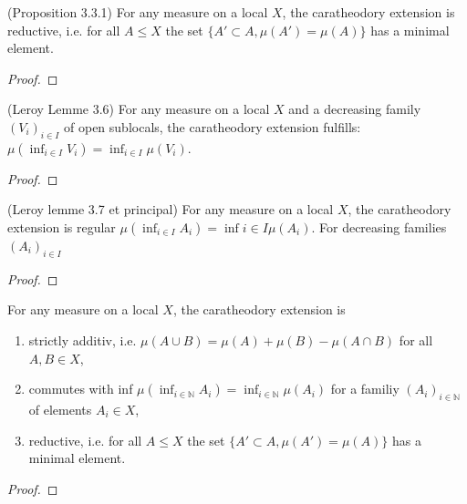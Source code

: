 \begin{proposition}[reductive]
    \leanok
    \label{prop:reductive}  (Proposition 3.3.1)
    For any measure on a local $X$, the caratheodory extension is
    reductive, i.e. for all $A \le X$ the set $\{A' \subset A, \mu(A') = \mu(A)\}$ has a minimal element.
\end{proposition}
\begin{proof}
    \leanok
\end{proof}



\begin{lemma}
(Leroy Lemme 3.6)
    \label{lem:commutes_with_inf_opens}
    \leanok
For any measure on a local $X$ and a decreasing family $(V_i)_{i\in I}$ of open sublocals, the caratheodory extension fulfills: $\mu (\inf_{i\in I} V_i) = \inf_{i\in I} \mu(V_i)$.
\end{lemma}
\begin{proof}
    \leanok
\end{proof}

\begin{proposition}
(Leroy lemme 3.7 et principal)
    \leanok
    \label{prop:commutes_with_inf}
    For any measure on a local $X$, the caratheodory extension is
    regular $\mu (\inf_{i\in I} A_i) = \inf{i\in I} \mu(A_i)$. For decreasing families $(A_i)_{i\in I}$
\end{proposition}
\begin{proof}
    \leanok
\end{proof}

\begin{theorem}
    \label{thm:main}
    \leanok
    For any measure on a local $X$, the caratheodory extension is
    \begin{enumerate}
        \item strictly additiv, i.e. $\mu (A \cup B) = \mu(A) + \mu(B) - \mu(A \cap B)$ for all $A,B\in X$,
        \item commutes with inf $\mu (\inf_{i\in\mathbb{N}} A_i) = \inf_{i\in\mathbb{N}} \mu(A_i)$ for a familiy $(A_i)_{i\in\mathbb{N}}$ of elements $A_i\in X$,
        \item reductive, i.e. for all $A \le X$ the set $\{A' \subset A, \mu(A') = \mu(A)\}$ has a minimal element.
    \end{enumerate}
\end{theorem}
\begin{proof}
    \leanok
\end{proof}



